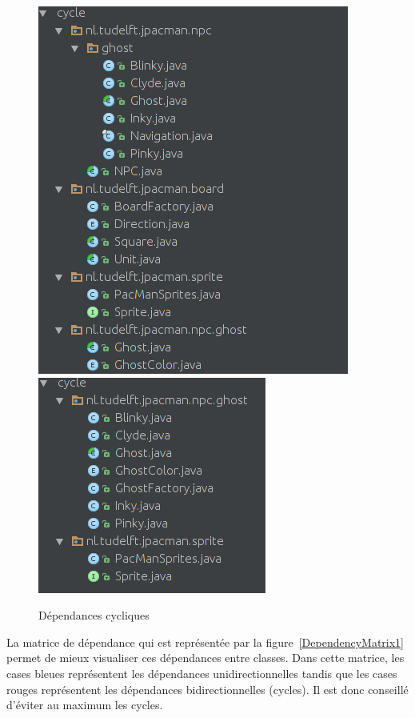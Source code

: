 \documentclass[12pt, openany]{report}
\begin{document}
\begin{figure}[!h]
	\centering
	\includegraphics[scale=0.4]{Images/DependencyCycle5.png}
	\includegraphics[scale=0.5]{Images/DependencyCycle6.png} 
		\caption{Dépendances cycliques}
 
	\label{DependencyCycle1}
\end{figure}

\newpage

La matrice de dépendance qui est représentée par la figure~\ref{DependencyMatrix1} permet de mieux visualiser ces dépendances entre classes. Dans cette matrice, les cases bleues représentent les dépendances unidirectionnelles tandis que les cases rouges représentent les dépendances bidirectionnelles (cycles). Il est donc conseillé d'éviter au maximum les cycles.
\end{document}
